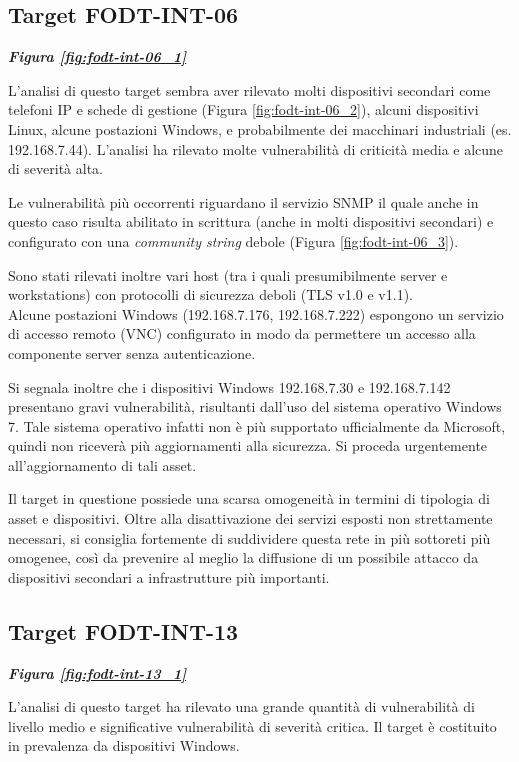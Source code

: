 \documentclass[target=bach,aauheader=]{thud}
\begin{document}
\subsection{Target FODT-INT-06} \label{fodt-int-06} \textbf{\textit{Figura \ref{fig:fodt-int-06_1}}}

L’analisi di questo target sembra aver rilevato molti dispositivi secondari come telefoni IP e schede di gestione (Figura \ref{fig:fodt-int-06_2}), alcuni dispositivi Linux, alcune postazioni Windows, e probabilmente dei macchinari industriali (es. 192.168.7.44).
L’analisi ha rilevato molte vulnerabilità di criticità media e alcune di severità alta.

Le vulnerabilità più occorrenti riguardano il servizio SNMP il quale anche in questo caso risulta abilitato in scrittura (anche in molti dispositivi secondari) e configurato con una \textit{community string} debole (Figura \ref{fig:fodt-int-06_3}).

Sono stati rilevati inoltre vari host (tra i quali presumibilmente server e workstations) con protocolli di sicurezza deboli (TLS v1.0 e v1.1).
\\ Alcune postazioni Windows (192.168.7.176, 192.168.7.222) espongono un servizio di accesso remoto (VNC) configurato in modo da permettere un accesso alla componente server senza autenticazione.

Si segnala inoltre che i dispositivi Windows 192.168.7.30 e 192.168.7.142 presentano gravi vulnerabilità, risultanti dall’uso del sistema operativo Windows 7. Tale sistema operativo infatti non è più supportato ufficialmente da Microsoft, quindi non riceverà più aggiornamenti alla sicurezza. Si proceda urgentemente all’aggiornamento di tali asset.

Il target in questione possiede una scarsa omogeneità in termini di tipologia di asset e dispositivi. Oltre alla disattivazione dei servizi esposti non strettamente necessari, si consiglia fortemente di suddividere questa rete in più sottoreti più omogenee, così da prevenire al meglio la diffusione di un possibile attacco da dispositivi secondari a infrastrutture più importanti.

\subsection{Target FODT-INT-13} \label{fodt-int-13} \textbf{\textit{Figura \ref{fig:fodt-int-13_1}}}

L’analisi di questo target ha rilevato una grande quantità di vulnerabilità di livello medio e significative vulnerabilità di severità critica. Il target è costituito in prevalenza da dispositivi Windows.
\end{document}
